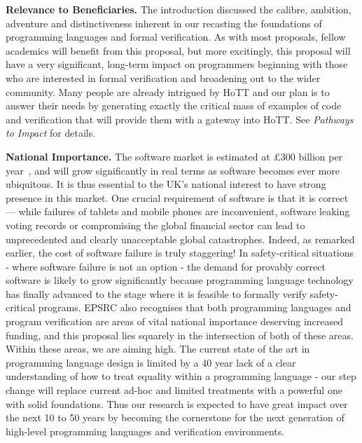 \documentclass[a4paper,11pt]{article}
\begin{document}
\vspace*{-0.1in}


{\bf Relevance to Beneficiaries.} The introduction discussed the
calibre, ambition, adventure and distinctiveness inherent in our
recasting the foundations of programming languages and formal
verification. As with most proposals, fellow academics will benefit
from this proposal, but more excitingly, this proposal will have a
very significant, long-term impact on programmers beginning with those
who are interested in formal verification and broadening out to the
wider community. Many people are
already intrigued by HoTT and our plan is to answer their needs by
generating exactly the critical mass of examples of code and
verification that will provide them with a gateway into HoTT. See {\em
  Pathways to Impact} for details. 
 

{\bf National Importance.} The software market is estimated at
$\pounds 300$ billion per year~\cite{}, and will grow significantly in
real terms as software becomes ever more ubiquitous. It is thus
essential to the UK's national interest to have strong presence in
this market. One crucial requirement of software is that it is correct
--- while failures of tablets and mobile phones are inconvenient,
software leaking voting records or compromising the global financial
sector can lead to unprecedented and clearly unacceptable global
catastrophes. Indeed, as remarked earlier, the cost of software
failure is truly staggering! In safety-critical situations - where
software failure is not an option - the demand for provably correct
software is likely to grow significantly because programming
language technology has finally advanced to the stage where it is
feasible to formally verify safety-critical programs.  EPSRC also recognises
that both programming languages and program verification are areas of
vital national importance deserving increased funding, and this
proposal lies squarely in the intersection of both of these
areas. Within these areas, we are aiming high.  The current state of
the art in programming language design is limited by a 40 year lack of
a clear understanding of how to treat equality within a programming
language - our step change will replace current ad-hoc and limited
treatments with a powerful one with solid foundations. Thus our
research is expected to have great impact over the next 10 to 50 years
by becoming the cornerstone for the next generation of high-level
programming languages and verification environments.
\end{document}
